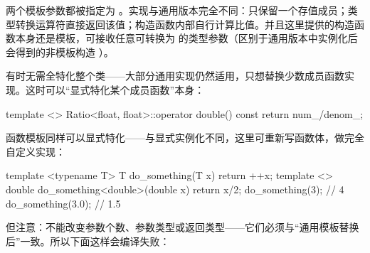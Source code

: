 两个模板参数都被指定为 。实现与通用版本完全不同：只保留一个存值成员；类型转换运算符直接返回该值；构造函数内部自行计算比值。并且这里提供的构造函数本身还是模板，可接收任意可转换为  的类型参数（区别于通用版本中实例化后会得到的非模板构造 ）。

有时无需全特化整个类——大部分通用实现仍然适用，只想替换少数成员函数实现。这时可以“显式特化某个成员函数”本身：

\begin{code}
template <> Ratio<float, float>::operator double() const {
  return num_/denom_;
}
\end{code}

函数模板同样可以显式特化——与显式实例化不同，这里可重新写函数体，做完全自定义实现：

\begin{code}
template <typename T> T do_something(T x) {
  return ++x;
}
template <> double do_something<double>(double x) {
  return x/2;
}
do_something(3);        // 4
do_something(3.0);    // 1.5
\end{code}

但注意：不能改变参数个数、参数类型或返回类型——它们必须与“通用模板替换后”一致。所以下面这样会编译失败：

